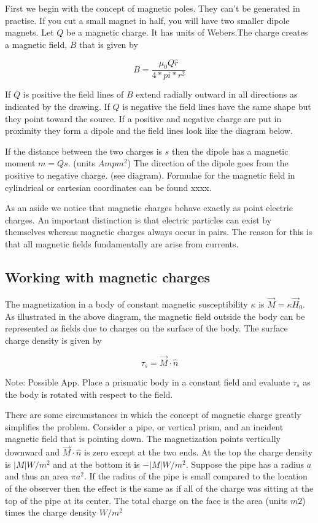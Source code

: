 \documentclass{article}
\begin{document}
First we begin with the concept of magnetic poles. They can't be generated in practise. If you cut a small magnet in half, you will have two smaller dipole magnets. Let $Q$ be a magnetic charge. It has units of Webers.The charge creates a magnetic field, $B$ that is given by


\begin{equation}
B=  \frac{ \mu_0 Q \hat r}{4*pi*r^2}
\end{equation}

If $Q$ is positive the field lines of $B$ extend radially outward in all directions as indicated by the drawing. If $Q$ is negative the field lines have the same shape but they point toward the source. If a positive and negative charge are put in proximity they form a dipole and the field lines look like the diagram below.


\bigskip

If the distance between the two charges is $s$ then the dipole has a magnetic moment $m=Qs$. (units $Amp m^2$) The direction of the dipole goes from the positive to negative charge. (see diagram). Formulae for the magnetic field in cylindrical or cartesian coordinates can be found xxxx.

\bigskip

As an aside we notice that magnetic charges behave exactly as point electric charges. An important distinction is that electric particles can exist by themselves whereas magnetic charges always occur in pairs. The reason for this is that all magnetic fields fundamentally are arise from currents.


\subsection{Working with magnetic charges}

The magnetization in a body of constant magnetic susceptibility $\kappa$ is $\vec M = \kappa \vec H_0$. As illustrated in the above diagram, the magnetic field outside the body can be represented as fields  due to charges on the surface of the body. The surface charge density is given by


\begin{equation}
\tau_s= \vec M \cdot \hat n
\end{equation}

Note:  Possible App. Place a prismatic body in a  constant field and evaluate $\tau_s$ as the body is rotated with respect to the field.

There are some circumstances in which the concept of magnetic charge greatly simplifies the problem. Consider a pipe, or vertical prism, and an incident magnetic field that is pointing down. The magnetization points vertically downward and $\vec{M} \cdot \hat n$ is zero except at the two ends. At the top the charge density is $|M| W/m^2$ and at the bottom it is $-|M| W/m^2$. Suppose the pipe has a radius $a$ and thus an area $\pi a^2$. If the radius of the pipe is small compared to the location of the observer then the effect is the same as if all of the charge was sitting at the top of the pipe at its center. The total charge on the face is the area (units $m2$) times the charge density $W/m^2$
\end{document}
